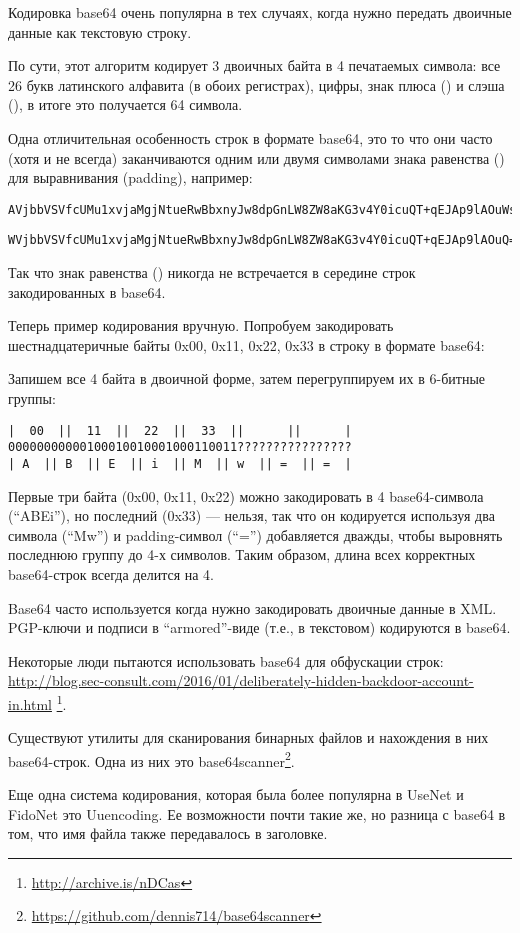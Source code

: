 
Кодировка base64 очень популярна в тех случаях, когда нужно передать двоичные данные как текстовую строку.

По сути, этот алгоритм кодирует 3 двоичных байта в 4 печатаемых символа:
все 26 букв латинского алфавита (в обоих регистрах), цифры, знак плюса (\q{+}) и слэша (\q{/}),
в итоге это получается 64 символа.

Одна отличительная особенность строк в формате base64, это то что они часто (хотя и не всегда) заканчиваются
одним или двумя символами знака равенства (\q{=}) для выравнивания (\gls{padding}), например:

\begin{lstlisting}
AVjbbVSVfcUMu1xvjaMgjNtueRwBbxnyJw8dpGnLW8ZW8aKG3v4Y0icuQT+qEJAp9lAOuWs=
\end{lstlisting}

\begin{lstlisting}
WVjbbVSVfcUMu1xvjaMgjNtueRwBbxnyJw8dpGnLW8ZW8aKG3v4Y0icuQT+qEJAp9lAOuQ==
\end{lstlisting}

Так что знак равенства (\q{=}) никогда не встречается в середине строк закодированных в base64.

Теперь пример кодирования вручную.
Попробуем закодировать шестнадцатеричные байты 0x00, 0x11, 0x22, 0x33 в строку в формате base64:



Запишем все 4 байта в двоичной форме, затем перегруппируем их в 6-битные группы:

\begin{lstlisting}
|  00  ||  11  ||  22  ||  33  ||      ||      |
00000000000100010010001000110011????????????????
| A  || B  || E  || i  || M  || w  || =  || =  |
\end{lstlisting}

Первые три байта (0x00, 0x11, 0x22) можно закодировать в 4 base64-символа (``ABEi''),
но последний (0x33) --- нельзя,
так что он кодируется используя два символа (``Mw'') и \gls{padding}-символ (``='')
добавляется дважды, чтобы выровнять последнюю группу до 4-х символов.
Таким образом, длина всех корректных base64-строк всегда делится на 4.

Base64 часто используется когда нужно закодировать двоичные данные в XML.
PGP-ключи и подписи в ``armored''-виде (т.е., в текстовом) кодируются в base64.

Некоторые люди пытаются использовать base64 для обфускации строк:
\url{http://blog.sec-consult.com/2016/01/deliberately-hidden-backdoor-account-in.html}
\footnote{\url{http://archive.is/nDCas}}.

Существуют утилиты для сканирования бинарных файлов и нахождения в них base64-строк.
Одна из них это base64scanner\footnote{\url{https://github.com/dennis714/base64scanner}}.

Еще одна система кодирования, которая была более популярна в UseNet и FidoNet это Uuencoding.
Ее возможности почти такие же, но разница с base64 в том, что имя файла также передавалось в заголовке.
